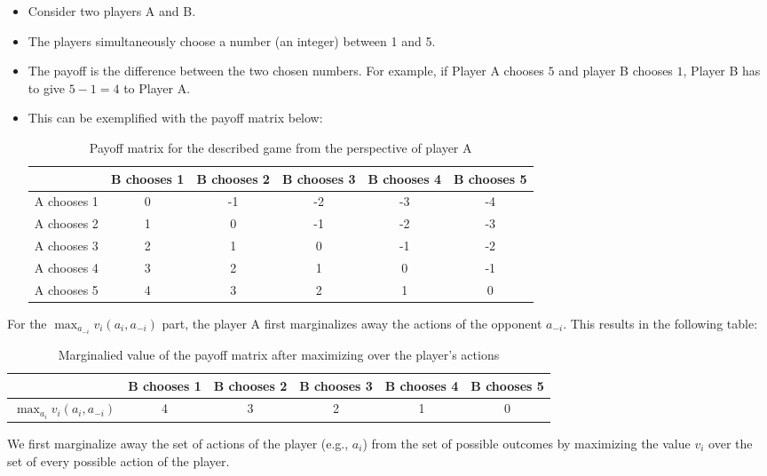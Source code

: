  \begin{itemize}
     \item Consider two players A and B.
     \item The players simultaneously choose a number (an integer) between 1 and 5.
     \item The payoff is the difference between the two chosen numbers. For example, if Player A chooses $5$ and player B chooses $1$, Player B has to give $5-1=4$ to Player A.
     \item This can be exemplified with the payoff matrix below:
     \begin{table}[!ht]
         \centering
         \begin{tabular}{|c|c|c|c|c|c|}\hline
               & B chooses 1 & B chooses 2 & B chooses 3 & B chooses 4 & B chooses 5  \\ \hline 
              A chooses 1 & 0 & -1& -2& -3&  -4 \\ \hline
              A chooses 2 & 1 & 0 & -1 & -2 & -3   \\ \hline
              A chooses 3 & 2 & 1 & 0 & -1 & -2  \\ \hline
              A chooses 4 & 3 & 2 & 1 & 0 &  -1 \\ \hline
              A chooses 5 & 4 & 3 & 2 & 1 & 0  \\ \hline
         \end{tabular}
         \caption{Payoff matrix for the described game from the perspective of player A}
         \label{tab:my_label}
     \end{table}
 \end{itemize}
For the $\max_{a_{-i}} v_i (a_i, a_{-i})$ part, the player A first marginalizes away the actions of the opponent $a_{-i}$. This results in the following table:

     \begin{table}[!ht]
         \centering
         \begin{tabular}{|c|c|c|c|c|c|}\hline
               & B chooses 1 & B chooses 2 & B chooses 3 & B chooses 4 & B chooses 5  \\ \hline 
              $\max_{a_i} v_i(a_i, a_{-i})$ & 4 & 3& 2& 1&  0 \\ \hline
         \end{tabular}
         \caption{Marginalied value of the payoff matrix after maximizing over the player's actions}
         \label{tab:my_label}
     \end{table}

 We first marginalize away the set of actions of the player (e.g., $a_{i}$) from the set of possible outcomes by maximizing the value $v_i$ over the set of every possible action of the player. 
 
